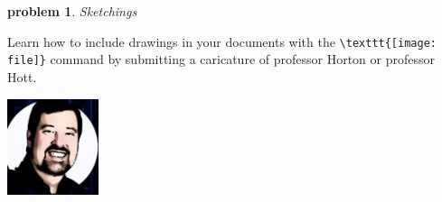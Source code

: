 \documentclass[10pt]{article}
\newtheorem{problem}{\sc\color{cit}problem}
\begin{document}
\begin{problem} Sketchings \end{problem}
Learn how to include drawings in your documents with the \verb|\texttt{[image: file]}| command by submitting a caricature of professor Horton or professor Hott.

\includegraphics[width=0.2\textwidth]{image/caricature.png}





\end{document}
